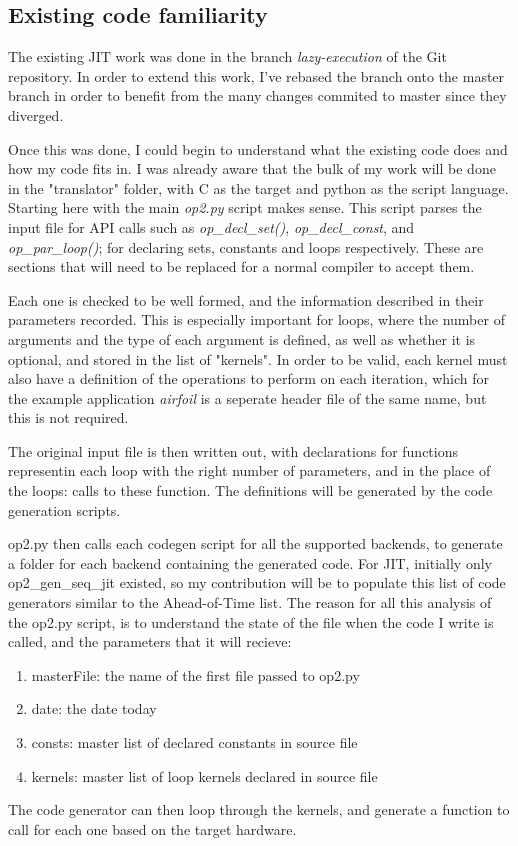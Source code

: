 \documentclass[11pt]{article}
\begin{document}
\subsection*{Existing code familiarity}
The existing JIT work was done in the branch \textit{lazy-execution} of the Git repository. In order to extend this work, I've rebased the branch onto the master branch in order to benefit from the many changes commited to master since they diverged. 
\par Once this was done, I could begin to understand what the existing code does and how my code fits in. I was already aware that the bulk of my work will be done in the "translator" folder, with C as the target and python as the script language. Starting here with the main \textit{op2.py} script makes sense. This script parses the input file for API calls such as \textit{op\_decl\_set()}, \textit{op\_decl\_const}, and \textit{op\_par\_loop()}; for declaring sets, constants and loops respectively. These are sections that will need to be replaced for a normal compiler to accept them.
\par Each one is checked to be well formed, and the information described in their parameters recorded. This is especially important for loops, where the number of arguments and the type of each argument is defined, as well as whether it is optional, and stored in the list of "kernels". In order to be valid, each kernel must also have a definition of the operations to perform on each iteration, which for the example application \textit{airfoil} is a seperate header file of the same name, but this is not required.
\par The original input file is then written out, with declarations for functions representin each loop with the right number of parameters, and in the place of the loops: calls to these function. The definitions will be generated by the code generation scripts. 
\par op2.py then calls each codegen script for all the supported backends, to generate a folder for each backend containing the generated code. For JIT, initially only op2\_gen\_seq\_jit existed, so my contribution will be to populate this list of code generators similar to the Ahead-of-Time list. The reason for all this analysis of the op2.py script, is to understand the state of the file when the code I write is called, and the parameters that it will recieve:
\begin{enumerate}
\item{masterFile: the name of the first file passed to op2.py}
\item{date: the date today}
\item{consts: master list of declared constants in source file}
\item{kernels: master list of loop kernels declared in source file}
\end{enumerate}
The code generator can then loop through the kernels, and generate a function to call for each one based on the target hardware.
\end{document}
